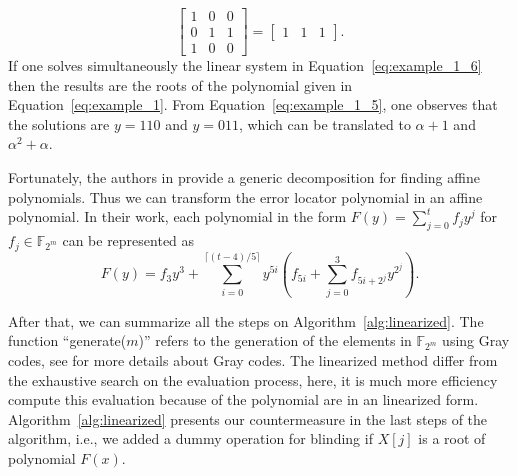 \begin{example}
\begin{equation}
    \begin{bmatrix}
    1 & 0 & 0 \\
    0 & 1 & 1 \\
    1 & 0 & 0
    \end{bmatrix}
    =
    \begin{bmatrix} 1 & 1 & 1 \end{bmatrix}.
\end{equation}
If one solves simultaneously the linear system in Equation~\ref{eq:example_1_6} then the results are the roots of the polynomial given in Equation~\ref{eq:example_1}. From Equation~\ref{eq:example_1_5}, one observes that the solutions are $y=110$ and $y=011$, which can be translated to $\alpha + 1$ and $\alpha^2 + \alpha$.
\end{example}


Fortunately, the authors in \cite{fedorenko2002finding} provide a generic decomposition for finding affine polynomials. Thus we can transform the error locator polynomial in an affine polynomial. In their work, each polynomial in the form $F(y) = \sum_{j=0}^{t} f_jy^j$ for $f_j \in \mathbb{F}_{2^m}$ can be represented as
\begin{equation}
\label{eq:f_y}
    F(y) = f_3y^3 + \sum_{i=0}^{\lceil (t-4)/5 \rceil} y^{5i}(f_{5i} + \sum_{j=0}^{3} f_{5i+2^j}y^{2^j}).
\end{equation}

After that, we can summarize all the steps on Algorithm~\ref{alg:linearized}. The function ``generate($m$)'' refers to the generation of the elements in $\mathbb{F}_{2^m}$ using Gray codes, see \cite{savage1997survey} for more details about Gray codes. The linearized method differ from the exhaustive search on the evaluation process, here, it is much more efficiency compute this evaluation because of the polynomial are in an linearized form. Algorithm~\ref{alg:linearized} presents our countermeasure in the last steps of the algorithm, i.e., we added a dummy operation for blinding if $X[j]$ is a root of polynomial $F(x)$.

